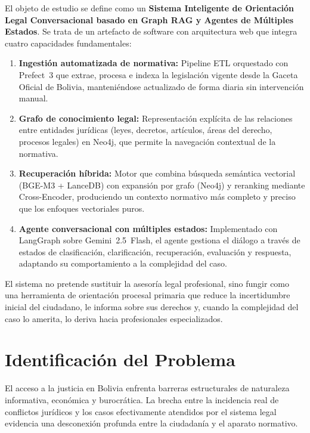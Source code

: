 \documentclass[12pt, letterpaper]{report}
\begin{document}
El objeto de estudio se define como un \textbf{Sistema Inteligente de Orientaci\'{o}n Legal Conversacional basado en Graph RAG y Agentes de M\'{u}ltiples Estados}. Se trata de un artefacto de software con arquitectura web que integra cuatro capacidades fundamentales:

\begin{enumerate}
  \item \textbf{Ingesti\'{o}n automatizada de normativa:} Pipeline ETL orquestado con Prefect~3 que extrae, procesa e indexa la legislaci\'{o}n vigente desde la Gaceta Oficial de Bolivia, manteni\'{e}ndose actualizado de forma diaria sin intervenci\'{o}n manual.

  \item \textbf{Grafo de conocimiento legal:} Representaci\'{o}n expl\'{i}cita de las relaciones entre entidades jur\'{i}dicas (leyes, decretos, art\'{i}culos, \'{a}reas del derecho, procesos legales) en Neo4j, que permite la navegaci\'{o}n contextual de la normativa.

  \item \textbf{Recuperaci\'{o}n h\'{i}brida:} Motor que combina b\'{u}squeda sem\'{a}ntica vectorial (BGE-M3 + LanceDB) con expansi\'{o}n por grafo (Neo4j) y reranking mediante Cross-Encoder, produciendo un contexto normativo m\'{a}s completo y preciso que los enfoques vectoriales puros.

  \item \textbf{Agente conversacional con m\'{u}ltiples estados:} Implementado con LangGraph sobre Gemini~2.5~Flash, el agente gestiona el di\'{a}logo a trav\'{e}s de estados de clasificaci\'{o}n, clarificaci\'{o}n, recuperaci\'{o}n, evaluaci\'{o}n y respuesta, adaptando su comportamiento a la complejidad del caso.
\end{enumerate}

El sistema no pretende sustituir la asesor\'{i}a legal profesional, sino fungir como una herramienta de orientaci\'{o}n procesal primaria que reduce la incertidumbre inicial del ciudadano, le informa sobre sus derechos y, cuando la complejidad del caso lo amerita, lo deriva hacia profesionales especializados.

\section{Identificaci\'{o}n del Problema}

El acceso a la justicia en Bolivia enfrenta barreras estructurales de naturaleza informativa, econ\'{o}mica y burocr\'{a}tica. La brecha entre la incidencia real de conflictos jur\'{i}dicos y los casos efectivamente atendidos por el sistema legal evidencia una desconexi\'{o}n profunda entre la ciudadan\'{i}a y el aparato normativo.
\end{document}
